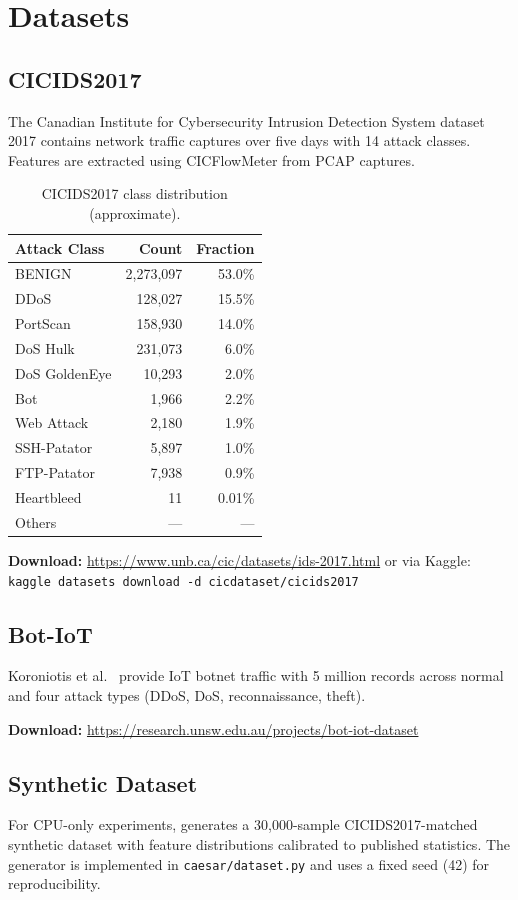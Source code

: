 \chapter{Datasets}
\label{app:datasets}

\section{CICIDS2017}

The Canadian Institute for Cybersecurity Intrusion Detection System
dataset 2017 \cite{sharafaldin2018} contains network traffic captures
over five days with 14 attack classes.
Features are extracted using CICFlowMeter from PCAP captures.

\begin{table}[H]
\centering
\caption{CICIDS2017 class distribution (approximate).}
\begin{tabular}{@{}lrr@{}}
\toprule
Attack Class & Count & Fraction \\
\midrule
BENIGN           & 2,273,097 & 53.0\% \\
DDoS             & 128,027   & 15.5\% \\
PortScan         & 158,930   & 14.0\% \\
DoS Hulk         & 231,073   &  6.0\% \\
DoS GoldenEye    &  10,293   &  2.0\% \\
Bot              &   1,966   &  2.2\% \\
Web Attack       &   2,180   &  1.9\% \\
SSH-Patator      &   5,897   &  1.0\% \\
FTP-Patator      &   7,938   &  0.9\% \\
Heartbleed       &      11   &  0.01\% \\
Others           & --- & --- \\
\bottomrule
\end{tabular}
\end{table}

\textbf{Download:} \url{https://www.unb.ca/cic/datasets/ids-2017.html}
or via Kaggle: \texttt{kaggle datasets download -d cicdataset/cicids2017}

\section{Bot-IoT}

Koroniotis et al.\ \cite{koroniotis2019} provide IoT botnet traffic
with 5 million records across normal and four attack types (DDoS, DoS,
reconnaissance, theft).

\textbf{Download:} \url{https://research.unsw.edu.au/projects/bot-iot-dataset}

\section{Synthetic Dataset}

For CPU-only experiments, \caesar{} generates a 30,000-sample
CICIDS2017-matched synthetic dataset with feature distributions
calibrated to published statistics.
The generator is implemented in \texttt{caesar/dataset.py} and uses
a fixed seed (42) for reproducibility.

